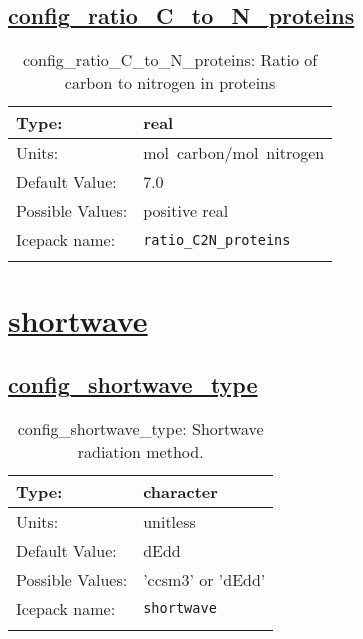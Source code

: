 \subsection[config\_ratio\_C\_to\_N\_proteins]{\hyperref[sec:nm_tab_biogeochemistry]{config\_ratio\_C\_to\_N\_proteins}}
\label{subsec:nm_sec_config_ratio_C_to_N_proteins}
\begin{center}
\begin{longtable}{| p{2.0in} || p{4.0in} |}
    \hline
    Type: & real \\
    \hline
    Units: & \si{mol.carbon/mol.nitrogen} \\
    \hline
    Default Value: & 7.0 \\
    \hline
    Possible Values: & positive real \\
    \hline
    Icepack name: & \verb+ratio_C2N_proteins+ \\
    \hline
    \caption{config\_ratio\_C\_to\_N\_proteins: Ratio of carbon to nitrogen in proteins}
\end{longtable}
\end{center}
\section[shortwave]{\hyperref[sec:nm_tab_shortwave]{shortwave}}
\label{sec:nm_sec_shortwave}
\subsection[config\_shortwave\_type]{\hyperref[sec:nm_tab_shortwave]{config\_shortwave\_type}}
\label{subsec:nm_sec_config_shortwave_type}
\begin{center}
\begin{longtable}{| p{2.0in} || p{4.0in} |}
    \hline
    Type: & character \\
    \hline
    Units: & \si{unitless} \\
    \hline
    Default Value: & dEdd \\
    \hline
    Possible Values: & 'ccsm3' or 'dEdd' \\
    \hline
    Icepack name: & \verb+shortwave+ \\
    \hline
    \caption{config\_shortwave\_type: Shortwave radiation method.}
\end{longtable}
\end{center}
